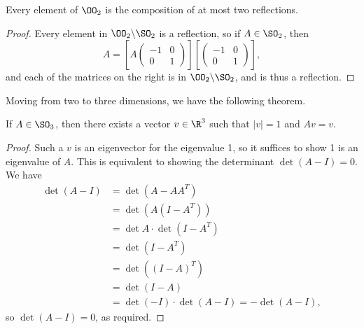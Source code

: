 \begin{corollary}
	Every element of $\OO_2$ is the composition of at most two reflections.
\end{corollary}
\begin{proof}
	Every element in $\OO_2 \backslash \SO_2$ is a reflection, so if $A \in \SO_2$, then
	$$
	A =\left[ A \begin{pmatrix}
		-1 & 0 \\ 0 & 1
	\end{pmatrix}\right]\left[\begin{pmatrix}
		-1 & 0 \\ 0 & 1
	\end{pmatrix}\right],
	$$
	and each of the matrices on the right is in $\OO_2 \backslash \SO_2$, and is thus a reflection.
\end{proof}

Moving from two to three dimensions, we have the following theorem.
\begin{theorem}
	If $A \in \SO_3$, then there exists a vector $v \in \R^3$ such that $|v| = 1$ and $Av = v$.
\end{theorem}
\begin{proof}
	Such a $v$ is an eigenvector for the eigenvalue 1, so it suffices to show 1 is an eigenvalue of $A$. This is equivalent to showing the determinant $\det(A - I) = 0$. We have
	{\allowdisplaybreaks
	\begin{align*}
\det(A - I) &= \det(A - AA^T) \\
			&= \det(A(I - A^T)) \\
			&= \det A \cdot \det (I - A^T) \\
			&= \det(I - A^T)\\
			&= \det((I - A)^T)\\
			&= \det(I - A) \\
			&= \det(-I) \cdot \det(A - I) = -\det(A - I),
	\end{align*}}
	so $\det(A - I) = 0$, as required.
\end{proof}

